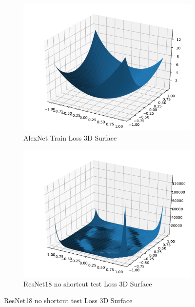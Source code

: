 \documentclass[twoside,a4paper]{refart}
\begin{document}
	\begin{figure}[th]
		\centering
		\caption{AlexNet és ResNet18}
		\label{fig:AlexNetResNet18}
		\begin{subfigure}[t]{0.49\linewidth}
			\centering
			\includegraphics[width=0.9\linewidth]{image/alexnet_train_loss_3dsurface}
			\caption[AlexNet]{AlexNet Train Loss 3D Surface}
			\label{fig:alexnettrainloss3dsurface}
		\end{subfigure}
		\hfil
		\begin{subfigure}[t]{0.49\linewidth}
			\centering
			\includegraphics[width=0.9\linewidth]{image/resnet18_no_shortcut_test_loss_3dsurface}
			\caption[ResNet18]{ResNet18 no shortcut test Loss 3D Surface}
			\label{fig:resnet18noshortcuttestloss3dsurface}
		\end{subfigure}
	
	\end{figure}
\end{document}
